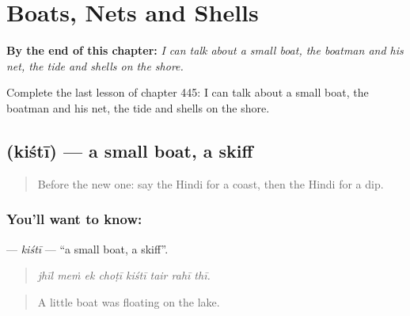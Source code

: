 
\chapter{Boats, Nets and Shells}
\label{ch:hi-boats-nets-and-shells}

\begin{chapteropening}
\textbf{By the end of this chapter:} \emph{I can talk about a small boat, the boatman and his net, the tide and shells on the shore.}

Complete the last lesson of chapter 445: I can talk about a small boat, the boatman and his net, the tide and shells on the shore.
\end{chapteropening}

\section[\texorpdfstring{\hi{किश्ती} (kiśtī)}{किश्ती (kiśtī)}]{ (kiśtī) — a small boat, a skiff}

\label{lesson:HI-C445-kisti}



\begin{quote}
Before the new one: say the Hindi for a coast, then the Hindi for a dip.
\end{quote}

\subsection*{You'll want to know: }
\textbf{} — \emph{kiśtī} — \textquotedblleft{}a small boat, a skiff\textquotedblright{}.

\begin{quote}
       
\end{quote}

\begin{quote}
\emph{jhīl meṁ ek choṭī kiśtī tair rahī thī.}
\end{quote}

\begin{quote}
A little boat was floating on the lake.
\end{quote}

